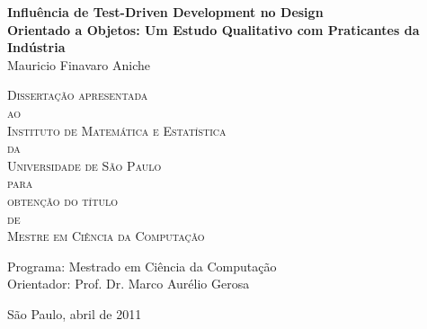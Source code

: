 \documentclass[11pt,twoside,a4paper]{book}
\begin{document}
\frontmatter 
\fancyhead[RO]{{\footnotesize\rightmark}\hspace{2em}\thepage}
\setcounter{tocdepth}{2}
\fancyhead[LE]{\thepage\hspace{2em}\footnotesize{\leftmark}}
\fancyhead[RE,LO]{}
\fancyhead[RO]{{\footnotesize\rightmark}\hspace{2em}\thepage}

\onehalfspacing  %

\thispagestyle{empty}
\begin{center}
    \vspace*{2.3cm}
    \textbf{\Large{Influência de Test-Driven Development no Design \\Orientado a
    Objetos: Um Estudo Qualitativo com Praticantes da Indústria}}\\
    
    \vspace*{1.2cm}
    \Large{Mauricio Finavaro Aniche}
    
    \vskip 2cm
    \textsc{
    Dissertação apresentada\\[-0.25cm] 
    ao\\[-0.25cm]
    Instituto de Matemática e Estatística\\[-0.25cm]
    da\\[-0.25cm]
    Universidade de São Paulo\\[-0.25cm]
    para\\[-0.25cm]
    obtenção do título\\[-0.25cm]
    de\\[-0.25cm]
    Mestre em Ciência da Computação}
    
    \vskip 1.5cm
    Programa: Mestrado em Ciência da Computação\\
    Orientador: Prof. Dr. Marco Aurélio Gerosa

   	\vskip 1.5cm
    \normalsize{São Paulo, abril de 2011}
\end{center}

\end{document}
